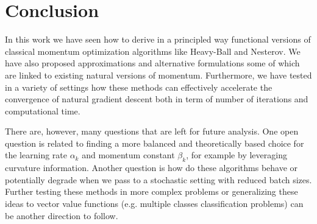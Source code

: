 \documentclass{article}
\theoremstyle{noparens}
\begin{document}
\section{Conclusion}

In this work we have seen how to derive in a principled way functional versions of classical momentum optimization algorithms like Heavy-Ball and Nesterov. We have also proposed approximations and alternative formulations some of which are linked to existing natural versions of momentum. Furthermore, we have tested in a variety of settings how these methods can effectively accelerate the convergence of natural gradient descent both in term of number of iterations and computational time.

There are, however, many questions that are left for future analysis. One open question is related to finding a more balanced and theoretically based choice for the learning rate $\alpha_k$ and momentum constant $\beta_k$, for example by leveraging curvature information. Another question is how do these algorithms behave or potentially degrade when we pass to a stochastic setting with reduced batch sizes. Further testing these methods in more complex problems or generalizing these ideas to vector value functions (e.g. multiple classes classification problems) can be another direction to follow.
























\FloatBarrier
\end{document}

